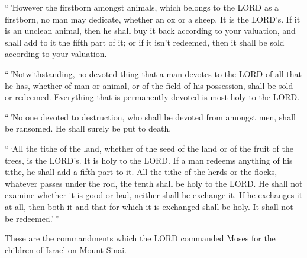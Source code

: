  ``\,'However the firstborn amongst animals, which
belongs to the LORD as a firstborn, no man may dedicate, whether an ox
or a sheep. It is the LORD's.  If it is an unclean
animal, then he shall buy it back according to your valuation, and shall
add to it the fifth part of it; or if it isn't redeemed, then it shall
be sold according to your valuation.

 ``\,'Notwithstanding, no devoted thing that a man
devotes to the LORD of all that he has, whether of man or animal, or of
the field of his possession, shall be sold or redeemed. Everything that
is permanently devoted is most holy to the LORD.

 ``\,'No one devoted to destruction, who shall be devoted
from amongst men, shall be ransomed. He shall surely be put to death.

 ``\,`All the tithe of the land, whether of the seed of
the land or of the fruit of the trees, is the LORD's. It is holy to the
LORD.  If a man redeems anything of his tithe, he shall
add a fifth part to it.  All the tithe of the herds or
the flocks, whatever passes under the rod, the tenth shall be holy to
the LORD.  He shall not examine whether it is good or
bad, neither shall he exchange it. If he exchanges it at all, then both
it and that for which it is exchanged shall be holy. It shall not be
redeemed.'\,''

 These are the commandments which the LORD commanded
Moses for the children of Israel on Mount Sinai.
